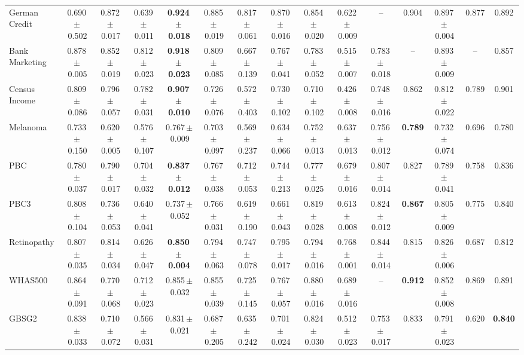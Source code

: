 \documentclass[8pt]{extarticle}
\begin{document}
\begin{longtable}{l*{14}{c}}
German Credit & 0.690\,$\pm$\,0.502 & 0.872\,$\pm$\,0.017 & 0.639\,$\pm$\,0.011 & \textbf{0.924\,$\pm$\,0.018} & 0.885\,$\pm$\,0.019 & 0.817\,$\pm$\,0.061 & 0.870\,$\pm$\,0.016 & 0.854\,$\pm$\,0.020 & 0.622\,$\pm$\,0.009 & -- & 0.904 & 0.897\,$\pm$\,0.004 & 0.877 & 0.892 \\
Bank Marketing & 0.878\,$\pm$\,0.005 & 0.852\,$\pm$\,0.019 & 0.812\,$\pm$\,0.023 & \textbf{0.918\,$\pm$\,0.023} & 0.809\,$\pm$\,0.085 & 0.667\,$\pm$\,0.139 & 0.767\,$\pm$\,0.041 & 0.783\,$\pm$\,0.052 & 0.515\,$\pm$\,0.007 & 0.783\,$\pm$\,0.018 & -- & 0.893\,$\pm$\,0.009 & -- & 0.857 \\
Census Income & 0.809\,$\pm$\,0.086 & 0.796\,$\pm$\,0.057 & 0.782\,$\pm$\,0.031 & \textbf{0.907\,$\pm$\,0.010} & 0.726\,$\pm$\,0.076 & 0.572\,$\pm$\,0.403 & 0.730\,$\pm$\,0.102 & 0.710\,$\pm$\,0.102 & 0.426\,$\pm$\,0.008 & 0.748\,$\pm$\,0.016 & 0.862 & 0.812\,$\pm$\,0.022 & 0.789 & 0.901 \\
Melanoma & 0.733\,$\pm$\,0.150 & 0.620\,$\pm$\,0.005 & 0.576\,$\pm$\,0.107 & 0.767\,$\pm$\,0.009 & 0.703\,$\pm$\,0.097 & 0.569\,$\pm$\,0.237 & 0.634\,$\pm$\,0.066 & 0.752\,$\pm$\,0.013 & 0.637\,$\pm$\,0.013 & 0.756\,$\pm$\,0.012 & \textbf{0.789} & 0.732\,$\pm$\,0.074 & 0.696 & 0.780 \\
PBC & 0.780\,$\pm$\,0.037 & 0.790\,$\pm$\,0.017 & 0.704\,$\pm$\,0.032 & \textbf{0.837\,$\pm$\,0.012} & 0.767\,$\pm$\,0.038 & 0.712\,$\pm$\,0.053 & 0.744\,$\pm$\,0.213 & 0.777\,$\pm$\,0.025 & 0.679\,$\pm$\,0.016 & 0.807\,$\pm$\,0.014 & 0.827 & 0.789\,$\pm$\,0.041 & 0.758 & 0.836 \\
PBC3 & 0.808\,$\pm$\,0.104 & 0.736\,$\pm$\,0.053 & 0.640\,$\pm$\,0.041 & 0.737\,$\pm$\,0.052 & 0.766\,$\pm$\,0.031 & 0.619\,$\pm$\,0.190 & 0.661\,$\pm$\,0.043 & 0.819\,$\pm$\,0.028 & 0.613\,$\pm$\,0.008 & 0.824\,$\pm$\,0.012 & \textbf{0.867} & 0.805\,$\pm$\,0.009 & 0.775 & 0.840 \\
Retinopathy & 0.807\,$\pm$\,0.035 & 0.814\,$\pm$\,0.034 & 0.626\,$\pm$\,0.047 & \textbf{0.850\,$\pm$\,0.004} & 0.794\,$\pm$\,0.063 & 0.747\,$\pm$\,0.078 & 0.795\,$\pm$\,0.017 & 0.794\,$\pm$\,0.016 & 0.768\,$\pm$\,0.001 & 0.844\,$\pm$\,0.014 & 0.815 & 0.826\,$\pm$\,0.006 & 0.687 & 0.812 \\
WHAS500 & 0.864\,$\pm$\,0.091 & 0.770\,$\pm$\,0.068 & 0.712\,$\pm$\,0.023 & 0.855\,$\pm$\,0.032 & 0.855\,$\pm$\,0.039 & 0.725\,$\pm$\,0.145 & 0.767\,$\pm$\,0.057 & 0.880\,$\pm$\,0.016 & 0.689\,$\pm$\,0.016 & -- & \textbf{0.912} & 0.852\,$\pm$\,0.008 & 0.869 & 0.891 \\
GBSG2 & 0.838\,$\pm$\,0.033 & 0.710\,$\pm$\,0.072 & 0.566\,$\pm$\,0.031 & 0.831\,$\pm$\,0.021 & 0.687\,$\pm$\,0.205 & 0.635\,$\pm$\,0.242 & 0.701\,$\pm$\,0.024 & 0.824\,$\pm$\,0.030 & 0.512\,$\pm$\,0.023 & 0.753\,$\pm$\,0.017 & 0.833 & 0.791\,$\pm$\,0.023 & 0.620 & \textbf{0.840} \\

\end{longtable}
\end{document}
